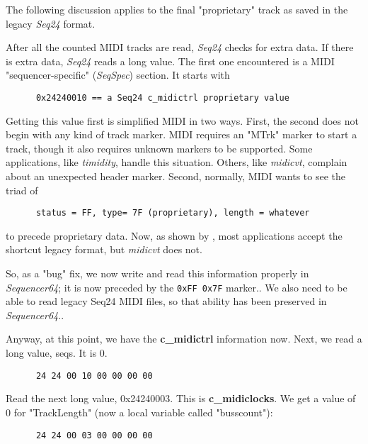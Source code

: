    The following discussion applies to the final "proprietary" track as
   saved in the legacy \textsl{Seq24} format.

   After all the counted MIDI tracks are read, \textsl{Seq24} checks for
   extra data.  If there is extra data, \textsl{Seq24} reads a long value.
   The first one encountered is a MIDI "sequencer-specific"
   (\textsl{SeqSpec}) section.  It starts with

   \begin{verbatim}
      0x24240010 == a Seq24 c_midictrl proprietary value
   \end{verbatim}

   Getting this value first is simplified MIDI in two ways.
   First, the second does not begin with any kind of track marker.  MIDI
   requires an "MTrk" marker to start a track, though it also requires
   unknown markers to be supported.  Some applications, like
   \textsl{timidity}, handle this situation.  Others, like \textsl{midicvt},
   complain about an unexpected header marker.
   Second, normally, MIDI wants to see the triad of

   \begin{verbatim}
      status = FF, type= 7F (proprietary), length = whatever
   \end{verbatim}

   to precede proprietary data.
   Now, as shown by ,
   most applications accept the shortcut legacy format, but \textsl{midicvt}
   does not.

   So, as a "bug" fix, we now write and read
   this information properly in \textsl{Sequencer64}; it is now
   preceded by the \texttt{0xFF 0x7F} marker..
   We also need to be able to read legacy Seq24 MIDI files, so that ability has
   been preserved in \textsl{Sequencer64}..

   Anyway, at this point, we have the \textbf{c\_midictrl} information now.
   Next, we read a long value, seqs.  It is 0.

   \begin{verbatim}
      24 24 00 10 00 00 00 00
   \end{verbatim}

   Read the next long value, 0x24240003.  This is \textbf{c\_midiclocks}.
   We get a value of 0 for "TrackLength" (now a local variable called
   "busscount"):

   \begin{verbatim}
      24 24 00 03 00 00 00 00
   \end{verbatim}

